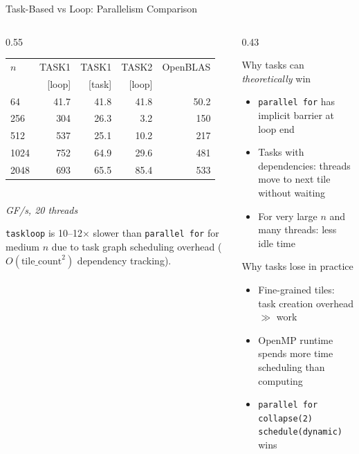 \documentclass[aspectratio=169,10pt]{beamer}
\begin{document}
\begin{frame}{Task-Based vs Loop: Parallelism Comparison}
  \begin{columns}
    \begin{column}{0.55\textwidth}
      \begin{center}
      \footnotesize
      \begin{tabular}{lrrrr}
        \toprule
        $n$ & TASK1 & TASK1 & TASK2 & OpenBLAS \\
            & {[loop]} & {[task]} & {[loop]} & \\
        \midrule
        64   & 41.7  & 41.8  & 41.8 & 50.2 \\
        256  & 304   & 26.3  & 3.2  & 150  \\
        512  & 537   & 25.1  & 10.2 & 217  \\
        1024 & 752   & 64.9  & 29.6 & 481  \\
        2048 & 693   & 65.5  & 85.4 & 533  \\
        \bottomrule
      \end{tabular}\\[0.2em]
      \textit{\scriptsize GF/s, 20 threads}
      \end{center}

      \vspace{0.5em}
      \alert{\texttt{taskloop} is 10--12$\times$ slower than \texttt{parallel for}} for medium $n$ due to task graph scheduling overhead ($O(\text{tile\_count}^2)$ dependency tracking).
    \end{column}
    \begin{column}{0.43\textwidth}
      \begin{block}{Why tasks can \emph{theoretically} win}
        \begin{itemize}
          \item \texttt{parallel for} has implicit barrier at loop end
          \item Tasks with dependencies: threads move to next tile without waiting
          \item For very large $n$ and many threads: less idle time
        \end{itemize}
      \end{block}
      \vspace{0.3em}
      \begin{alertblock}{Why tasks lose in practice}
        \begin{itemize}
          \item Fine-grained tiles: task creation overhead $\gg$ work
          \item OpenMP runtime spends more time scheduling than computing
          \item \texttt{parallel for collapse(2) schedule(dynamic)} wins
        \end{itemize}
      \end{alertblock}
    \end{column}
  \end{columns}
\end{frame}
\end{document}

